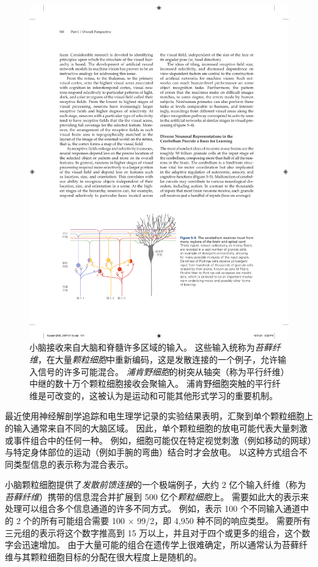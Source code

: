 \begin{figure}[htbp]
	\centering
	\includegraphics[width=0.9\linewidth]{chap05/fig_5_5}
	\caption{小脑接收来自大脑和脊髓许多区域的输入。
		这些输入统称为\textit{苔藓纤维}，在大量\textit{颗粒细胞}中重新编码，这是发散连接的一个例子，允许输入信号的许多可能混合。
		\textit{浦肯野细胞}的树突从轴突（称为平行纤维）中继的数十万个颗粒细胞接收会聚输入。
		浦肯野细胞突触的平行纤维是可改变的，这被认为是运动和可能其他形式学习的重要机制。}
	\label{fig:5_5}
\end{figure}


最近使用神经解剖学追踪和电生理学记录的实验结果表明，汇聚到单个颗粒细胞上的输入通常来自不同的大脑区域。
因此，单个颗粒细胞的放电可能代表大量刺激或事件组合中的任何一种。
例如，细胞可能仅在特定视觉刺激（例如移动的网球）与特定身体部位的运动（例如手腕的弯曲）结合时才会放电。
以这种方式组合不同类型信息的表示称为混合表示。


小脑颗粒细胞提供了\textit{发散前馈连接}的一个极端例子，大约 2 亿个输入纤维（称为\textit{苔藓纤维}）携带的信息混合并扩展到 500 亿个\textit{颗粒细胞}上。
需要如此大的表示来处理可以组合多个信息通道的许多不同方式。
例如，表示 100 个不同输入通道中的 2 个的所有可能组合需要 100 × 99/2，即 4,950 种不同的响应类型。
需要所有三元组的表示将这个数字推高到 15 万以上，并且对于四个或更多的组合，这个数字会迅速增加。
由于大量可能的组合在遗传学上很难确定，所以通常认为苔藓纤维与其颗粒细胞目标的分配在很大程度上是随机的。


